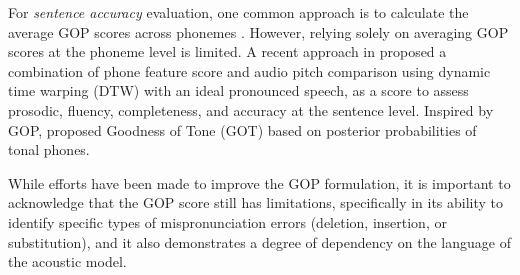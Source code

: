 \documentclass[11pt]{article}
\begin{document}

For \textit{sentence accuracy} evaluation, one common approach is to calculate the average GOP scores across phonemes \cite{kim1997automatic, STP}. However, relying solely on averaging GOP scores at the phoneme level is limited. A recent approach in \cite{10042421} proposed a combination of phone feature score and audio pitch comparison using dynamic time warping (DTW) with an ideal pronounced speech, as a score to assess prosodic, fluency, completeness, and accuracy at the sentence level. Inspired by GOP, \citet{tong2015goodness} proposed Goodness of Tone (GOT) based on posterior probabilities of tonal phones. 


While efforts have been made to improve the GOP formulation, it is important to acknowledge that the GOP score still has limitations, specifically in its ability to identify specific types of mispronunciation errors (deletion, insertion, or substitution), and it also demonstrates a degree of dependency on the language of the  acoustic model.

\end{document}
